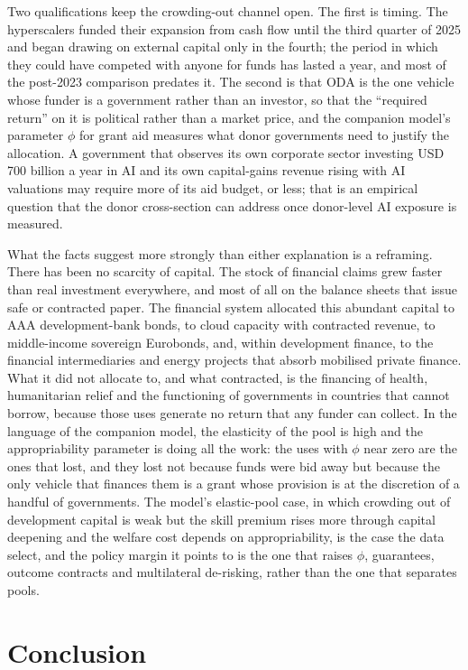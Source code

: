 \documentclass[AER]{AEA}
\begin{document}
Two qualifications keep the crowding-out channel open. The first is timing. The hyperscalers funded their expansion from cash flow until the third quarter of 2025 and began drawing on external capital only in the fourth; the period in which they could have competed with anyone for funds has lasted a year, and most of the post-2023 comparison predates it. The second is that ODA is the one vehicle whose funder is a government rather than an investor, so that the ``required return'' on it is political rather than a market price, and the companion model's parameter $\phi$ for grant aid measures what donor governments need to justify the allocation. A government that observes its own corporate sector investing USD 700 billion a year in AI and its own capital-gains revenue rising with AI valuations may require more of its aid budget, or less; that is an empirical question that the donor cross-section can address once donor-level AI exposure is measured.

What the facts suggest more strongly than either explanation is a reframing. There has been no scarcity of capital. The stock of financial claims grew faster than real investment everywhere, and most of all on the balance sheets that issue safe or contracted paper. The financial system allocated this abundant capital to AAA development-bank bonds, to cloud capacity with contracted revenue, to middle-income sovereign Eurobonds, and, within development finance, to the financial intermediaries and energy projects that absorb mobilised private finance. What it did not allocate to, and what contracted, is the financing of health, humanitarian relief and the functioning of governments in countries that cannot borrow, because those uses generate no return that any funder can collect. In the language of the companion model, the elasticity of the pool is high and the appropriability parameter is doing all the work: the uses with $\phi$ near zero are the ones that lost, and they lost not because funds were bid away but because the only vehicle that finances them is a grant whose provision is at the discretion of a handful of governments. The model's elastic-pool case, in which crowding out of development capital is weak but the skill premium rises more through capital deepening and the welfare cost depends on appropriability, is the case the data select, and the policy margin it points to is the one that raises $\phi$, guarantees, outcome contracts and multilateral de-risking, rather than the one that separates pools.

\section{Conclusion}
\end{document}
